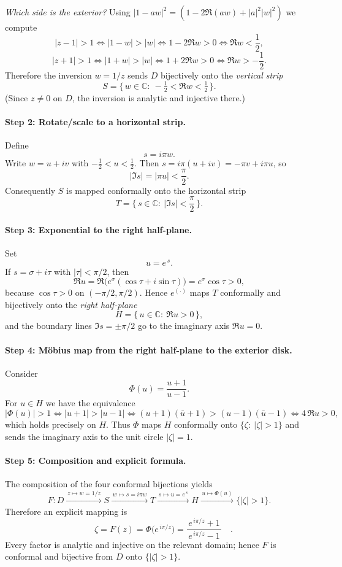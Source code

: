 \documentclass[11pt]{article}
\begin{document}
	\emph{Which side is the exterior?}  Using $|1-aw|^{2}=(1-2\Re(aw)+|a|^{2}|w|^{2})$ we compute
	\[
	|z-1|>1
	\iff |1-w|>|w|
	\iff 1-2\Re w>0
	\iff \Re w<\frac{1}{2},
	\]
	\[
	|z+1|>1
	\iff |1+ w|>|w|
	\iff 1+2\Re w>0
	\iff \Re w>-\frac{1}{2}.
	\]
	Therefore the inversion $w=1/z$ sends $D$ bijectively onto the \emph{vertical strip}
	\[
	S=\Big\{\,w\in\mathbb C:\ -\tfrac12<\Re w<\tfrac12\,\Big\}.
	\]
	(Since $z\neq 0$ on $D$, the inversion is analytic and injective there.)
	
	\paragraph{Step 2: Rotate/scale to a horizontal strip.}
	Define
	\[
	s=i\pi w.
	\]
	Write $w=u+iv$ with $-\tfrac12<u<\tfrac12$. Then $s=i\pi(u+iv)=-\pi v+i\pi u$, so
	\[
	|\Im s|=|\pi u|<\frac{\pi}{2}.
	\]
	Consequently $S$ is mapped conformally onto the horizontal strip
	\[
	T=\Big\{\,s\in\mathbb C:\ |\Im s|<\frac{\pi}{2}\,\Big\}.
	\]
	
	\paragraph{Step 3: Exponential to the right half-plane.}
	Set
	\[
	u=e^{\,s}.
	\]
	If $s=\sigma+i\tau$ with $|\tau|<\pi/2$, then
	\[
	\Re u = \Re\big(e^{\sigma}(\cos\tau+i\sin\tau)\big)=e^{\sigma}\cos\tau>0,
	\]
	because $\cos\tau>0$ on $(-\pi/2,\pi/2)$.
	Hence $e^{(\cdot)}$ maps $T$ conformally and bijectively onto the \emph{right half-plane}
	\[
	H=\{\,u\in\mathbb C:\ \Re u>0\,\},
	\]
	and the boundary lines $\Im s=\pm\pi/2$ go to the imaginary axis $\Re u=0$.
	
	\paragraph{Step 4: Möbius map from the right half-plane to the exterior disk.}
	Consider
	\[
	\Phi(u)=\frac{u+1}{u-1}.
	\]
	For $u\in H$ we have the equivalence
	\[
	|\Phi(u)|>1
	\iff |u+1|>|u-1|
	\iff (u+1)(\bar u+1)>(u-1)(\bar u-1)
	\iff 4\,\Re u>0,
	\]
	which holds precisely on $H$. Thus $\Phi$ maps $H$ conformally onto $\{\zeta:\ |\zeta|>1\}$ and
	sends the imaginary axis to the unit circle $|\zeta|=1$.
	
	\paragraph{Step 5: Composition and explicit formula.}
	The composition of the four conformal bijections yields
	\[
	F:D \xrightarrow{\,z\mapsto w=1/z\,} S
	\xrightarrow{\,w\mapsto s=i\pi w\,} T
	\xrightarrow{\,s\mapsto u=e^{\,s}\,} H
	\xrightarrow{\,u\mapsto \Phi(u)\,} \{|\zeta|>1\}.
	\]
	Therefore an explicit mapping is
	\[
	\boxed{\quad \zeta = F(z) = \Phi\!\big(e^{\,i\pi/z}\big)
		= \frac{e^{\,i\pi/z}+1}{\,e^{\,i\pi/z}-1\,}\quad }.
	\]
	Every factor is analytic and injective on the relevant domain; hence $F$ is conformal and bijective from $D$ onto $\{|\zeta|>1\}$.
	
\end{document}
